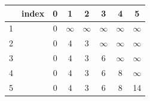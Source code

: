 \begin{itemize}
\begin{table}[!h]
{\begin{tabular}{c|ccccccc}
             & index & 0 & 1 & 2 & 3 & 4 & 5 \\
            \hline
            1 &  & {0} & $\infty$ & $\infty$ & $\infty$ & $\infty$ & $\infty$ \\
            2 &  & 0 & 4 & {3} & $\infty$ & $\infty$ & $\infty$ \\
            3 &  & 0 & {4} & 3 & 6 & $\infty$ & $\infty$ \\
            4 &  & 0 & 4 & 3 & 6 & {8} & $\infty$ \\
            5 &  & 0 & 4 & 3 & 6 & 8 & {14} \\
        \end{tabular}
        }
    \end{table}

\end{itemize}
